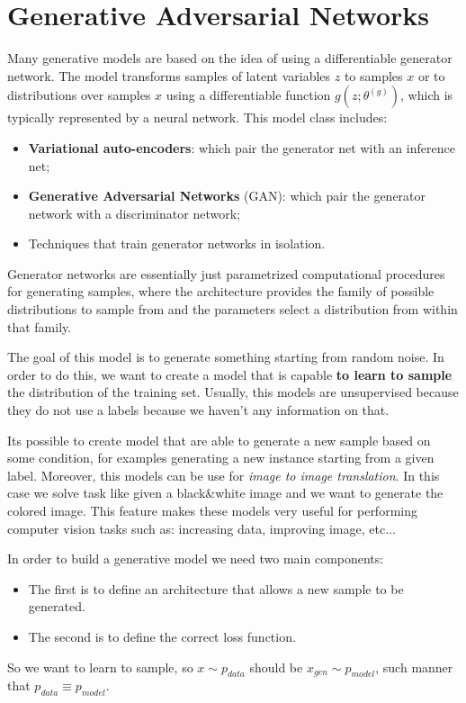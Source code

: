 \chapter{Generative Adversarial Networks}
Many generative models are based on the idea of using a differentiable generator
network. The model transforms samples of latent variables $z$ to samples $x$ or
to distributions over samples $x$ using a differentiable function $g(z; \theta^{(g)})$,
which is typically represented by a neural network. This model class includes:
\begin{itemize}
    \item \textbf{Variational auto-encoders}: which pair the generator net with
          an inference net;
    \item \textbf{Generative Adversarial Networks} (GAN): which pair the generator
          network with a discriminator network;
    \item Techniques that train generator networks in isolation.
\end{itemize}

Generator networks are essentially just parametrized computational procedures for
generating samples, where the architecture provides the family of possible
distributions to sample from and the parameters select a distribution from within
that family.

The goal of this model is to generate something starting from random noise. In
order to do this, we want to create a model that is capable \textbf{to learn to
    sample} the distribution of the training set. Usually, this models are
unsupervised because they do not use a labels because we haven't any information
on that.

Its possible to create model that are able to generate a new sample based on some
condition, for examples generating a new instance starting from a given label.
Moreover, this models can be use for \textit{image to image translation}. In this
case we solve task like given a black\&white image and we want to generate the
colored image. This feature makes these models very useful for performing computer
vision tasks such as: increasing data, improving image, etc$\dots$

In order to build a generative model we need two main components:
\begin{itemize}
    \item The first is to define an architecture that allows a new sample to be
          generated.
    \item The second is to define the correct loss function.
\end{itemize}
So we want to learn to sample, so $x \sim p_{data}$ should be $x_{gen}\sim p_{model}$,
such manner that $p_{data} \equiv p_{model}$.
